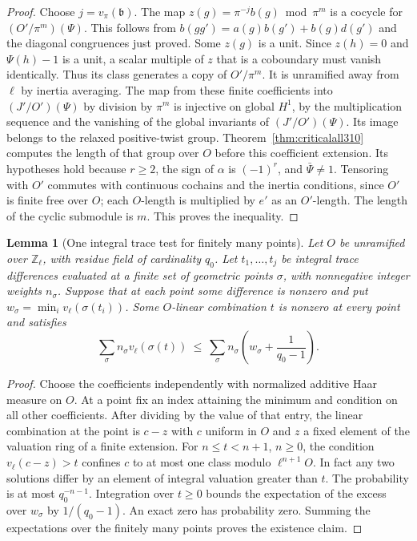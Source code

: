 \documentclass[a4paper,11pt]{article}
\newtheorem{lemma}[proposition]{Lemma}
\theoremstyle{definition}
\theoremstyle{remark}
\newcommand{\ZZ}{\mathbb Z}\newcommand{\ord}{\operatorname{ord}}
\numberwithin{equation}{section}
\begin{document}
\begin{proof}
Choose \(j=v_\pi(\mathfrak b)\). The map
\(z(g)=\pi^{-j}b(g)\bmod\pi^m\) is a cocycle for
\((O'/\pi^m)(\Psi)\). This follows from
\(b(gg')=a(g)b(g')+b(g)d(g')\) and the diagonal congruences
just proved. Some \(z(g)\) is a unit. Since \(z(h)=0\) and
\(\Psi(h)-1\) is a unit, a scalar multiple of \(z\) that is
a coboundary must vanish identically. Thus its class generates
a copy of \(O'/\pi^m\). It is unramified away from \(\ell\)
by inertia averaging. The map from these finite coefficients
into \((J'/O')(\Psi)\) by division by \(\pi^m\) is injective
on global \(H^1\), by the multiplication sequence and the
vanishing of the global invariants of \((J'/O')(\Psi)\).
Its image belongs to the relaxed positive-twist group.
Theorem~\ref{thm:criticalall310} computes the length of that
group over \(O\) before this coefficient extension. Its
hypotheses hold because \(r\ge2\), the sign of \(\alpha\)
is \((-1)^r\), and \(\bar\Psi\ne1\). Tensoring with \(O'\)
commutes with continuous cochains and the inertia conditions,
since \(O'\) is finite free over \(O\); each \(O\)-length is
multiplied by \(e'\) as an \(O'\)-length. The length of the
cyclic submodule is \(m\). This proves the inequality.
\end{proof}

\begin{lemma}[One integral trace test for finitely many points]
\leavevmode\label{lem:averagevaluation566}
Let \(O\) be unramified over \(\ZZ_\ell\), with residue field
of cardinality \(q_0\). Let \(t_1,\ldots,t_j\) be integral
trace differences evaluated at a finite set of geometric points
\(\sigma\), with nonnegative integer weights \(n_\sigma\).
Suppose that at each point some difference is nonzero and put
\(w_\sigma=\min_i v_\ell(\sigma(t_i))\). Some \(O\)-linear
combination \(t\) is nonzero at every point and satisfies
\[
   \sum_\sigma n_\sigma v_\ell(\sigma(t))
       \ \le\ \sum_\sigma n_\sigma
                       \left(w_\sigma+\frac{1}{q_0-1}\right).
\]
\end{lemma}
\begin{proof}
Choose the coefficients independently with normalized additive
Haar measure on \(O\). At a point fix an index attaining the
minimum and condition on all other coefficients. After dividing
by the value of that entry, the linear combination at the point
is \(c-z\) with \(c\) uniform in \(O\) and \(z\) a fixed element
of the valuation ring of a finite extension. For \(n\le t<n+1\),
\(n\ge0\), the condition \(v_\ell(c-z)>t\) confines \(c\) to
at most one class modulo \(\ell^{n+1}O\). In fact any two
solutions differ by an element of integral valuation greater
than \(t\). The probability is at most \(q_0^{-n-1}\).
Integration over \(t\ge0\) bounds the expectation of the
excess over \(w_\sigma\) by \(1/(q_0-1)\). An exact zero has
probability zero. Summing the expectations over the finitely
many points proves the existence claim.
\end{proof}
\end{document}
